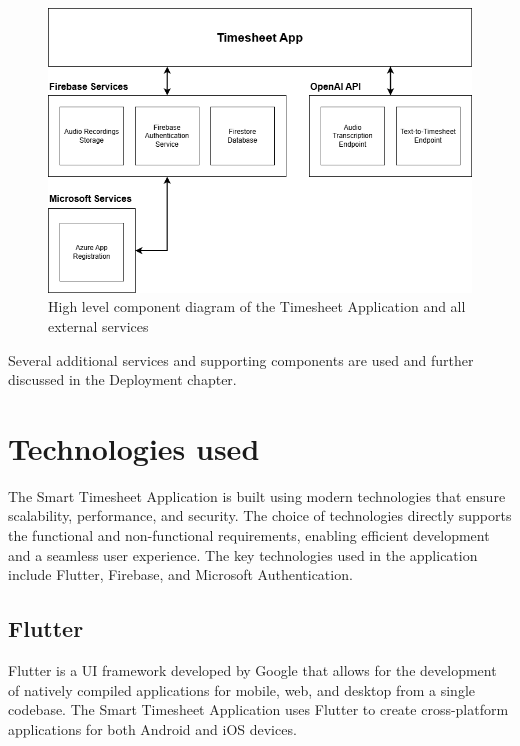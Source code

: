 \documentclass[
  digital,     %
  oneside,     %
  nosansbold,  %
  nocolorbold, %
  lof,         %
  lot,         %
]{fithesis4}
\begin{document}
\begin{figure}[ht]
    \centering
    \includegraphics[width=\textwidth]{assets/diagrams/timesheet_app_component_diagram.drawio.png}
    \caption{High level component diagram of the Timesheet Application and all external services}
    \label{fig:timesheet_app_architecture}
\end{figure}

Several additional services and supporting components are used and further discussed in the Deployment chapter. 

\shorthandon{-}

\chapter{Technologies used}

The Smart Timesheet Application is built using modern technologies that ensure scalability, performance, and security. The choice of technologies directly supports the functional and non-functional requirements, enabling efficient development and a seamless user experience. The key technologies used in the application include Flutter, Firebase, and Microsoft Authentication.

\section{Flutter}

Flutter is a UI framework developed by Google that allows for the development of natively compiled applications for mobile, web, and desktop from a single codebase. The Smart Timesheet Application uses Flutter to create cross-platform applications for both Android and iOS devices.
\end{document}
